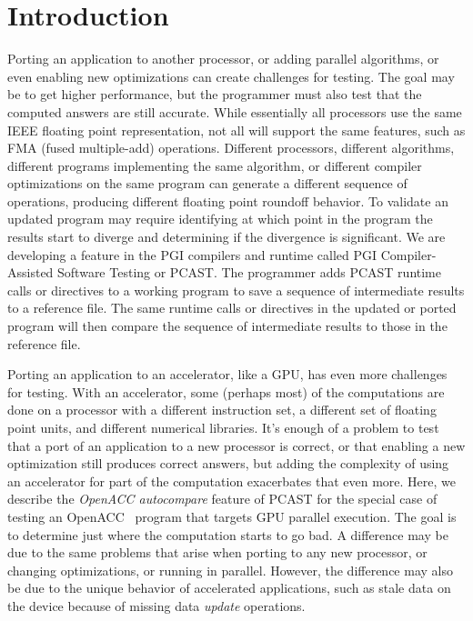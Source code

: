 \section{Introduction}

Porting an application to another processor, or adding parallel algorithms, or even enabling new optimizations can create challenges for testing.
The goal may be to get higher performance, but the programmer must also test that the computed answers are still accurate.
While essentially all processors use the same IEEE floating point representation, not all will support the same features, such as FMA (fused multiple-add) operations.
Different processors, different algorithms, different programs implementing the same algorithm, or different compiler optimizations on the same program can generate a different sequence of operations, producing different floating point roundoff behavior.
To validate an updated program may require identifying at which point in the program the results start to diverge and determining if the divergence is significant.
We are developing a feature in the PGI compilers and runtime called PGI Compiler-Assisted Software Testing or PCAST.
The programmer adds PCAST runtime calls or directives to a working program to save a sequence of intermediate results to a reference file.
The same runtime calls or directives in the updated or ported program will then compare the sequence of intermediate results to those in the reference file.

Porting an application to an accelerator, like a GPU, has even more challenges for testing.
With an accelerator, some (perhaps most) of the computations are done on a processor with a different instruction set, a different set of floating point units, and different numerical libraries.
It's enough of a problem to test that a port of an application to a new processor is correct, or that enabling a new optimization still produces correct answers, but adding the complexity of using an accelerator for part of the computation exacerbates that even more.
Here, we describe the \emph{OpenACC autocompare} feature of PCAST for the special case of testing an OpenACC~\cite{openacc.16} program that targets GPU parallel execution.
The goal is to determine just where the computation starts to go bad.
A difference may be due to the same problems that arise when porting to any new processor, or changing optimizations, or running in parallel.
However, the difference may also be due to the unique behavior of accelerated applications, such as stale data on the device because of missing data \emph{update} operations.

